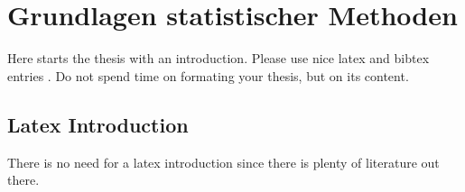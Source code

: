 \chapter{Grundlagen statistischer Methoden}

Here starts the thesis with an introduction. Please use nice latex and bibtex entries \cite{latex}. Do not spend time on formating your thesis, but on its content.

\section{Latex Introduction}
There is no need for a latex introduction since there is plenty of literature out there.
